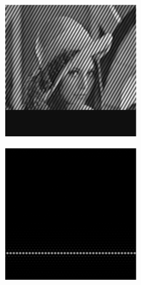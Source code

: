 \begin{figure}[h]
\begin{subfigure}[t]{0.23\textwidth}
      \caption{}
  \end{subfigure}\hfill
  \begin{subfigure}[t]{0.23\textwidth}
        \centering
        \includegraphics[width=\textwidth]{sim_slit/2/sim_angle_frame}
        \caption{}
    \end{subfigure}\hfill
    \begin{subfigure}[t]{0.23\textwidth}
        \centering
        \includegraphics[width=\textwidth]{sim_slit/2/sim_slit_pattern}

\end{subfigure}
\end{figure}
